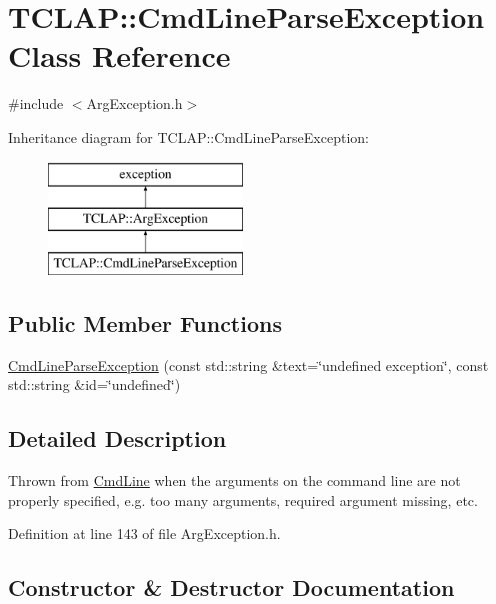 \hypertarget{class_t_c_l_a_p_1_1_cmd_line_parse_exception}{}\section{T\+C\+L\+A\+P\+:\+:Cmd\+Line\+Parse\+Exception Class Reference}
\label{class_t_c_l_a_p_1_1_cmd_line_parse_exception}


{\ttfamily \#include $<$Arg\+Exception.\+h$>$}

Inheritance diagram for T\+C\+L\+A\+P\+:\+:Cmd\+Line\+Parse\+Exception\+:\begin{figure}[H]
\begin{center}
\leavevmode
\includegraphics[height=3.000000cm]{class_t_c_l_a_p_1_1_cmd_line_parse_exception}
\end{center}
\end{figure}
\subsection*{Public Member Functions}
\begin{DoxyCompactItemize}
\item 
\hyperlink{class_t_c_l_a_p_1_1_cmd_line_parse_exception_a3b612ba299dd699845ea108b5eaa3249}{Cmd\+Line\+Parse\+Exception} (const std\+::string \&text=\char`\"{}undefined exception\char`\"{}, const std\+::string \&id=\char`\"{}undefined\char`\"{})
\end{DoxyCompactItemize}


\subsection{Detailed Description}
Thrown from \hyperlink{class_t_c_l_a_p_1_1_cmd_line}{Cmd\+Line} when the arguments on the command line are not properly specified, e.\+g. too many arguments, required argument missing, etc. 

Definition at line 143 of file Arg\+Exception.\+h.



\subsection{Constructor \& Destructor Documentation}
\hypertarget{class_t_c_l_a_p_1_1_cmd_line_parse_exception_a3b612ba299dd699845ea108b5eaa3249}{}
